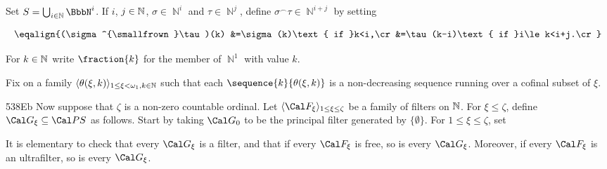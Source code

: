    Set $S=\bigcup_{i\in\Bbb N}\BbbN^i$.
If $i$, $j\in\Bbb N$, $\sigma\in\BbbN^i$ and
$\tau\in\BbbN^j$, define $\sigma^{\smallfrown}\tau\in\BbbN^{i+j}$ by
setting

$$\eqalign{(\sigma^{\smallfrown}\tau)(k)
&=\sigma(k)\text{ if }k<i,\cr
&=\tau(k-i)\text{ if }i\le k<i+j.\cr}$$

\noindent For $k\in\Bbb N$ write $\fraction{k}$ for the member of $\BbbN^1$
with value $k$.

Fix on a family
$\langle\theta(\xi,k)\rangle_{1\le\xi<\omega_1,k\in\Bbb N}$
such that each $\sequence{k}{\theta(\xi,k)}$ is a non-decreasing sequence
running over a cofinal subset of $\xi$.

\spheader 538Eb Now suppose that $\zeta$ is a non-zero
countable ordinal.
Let $\langle\Cal F_{\xi}\rangle_{1\le\xi\le\zeta}$ be a family of
filters on
$\Bbb N$.   For $\xi\le\zeta$, define $\Cal G_{\xi}\subseteq\Cal PS$ as
follows.   Start by taking $\Cal G_0$ to be
the principal filter generated by
$\{\emptyset\}$.   For $1\le\xi\le\zeta$, set


\noindent It is elementary to check that every $\Cal G_{\xi}$ is a
filter, and that if every $\Cal F_{\xi}$ is free, so is every
$\Cal G_{\xi}$.
Moreover, if every $\Cal F_{\xi}$ is an ultrafilter, so is every
$\Cal G_{\xi}$.

